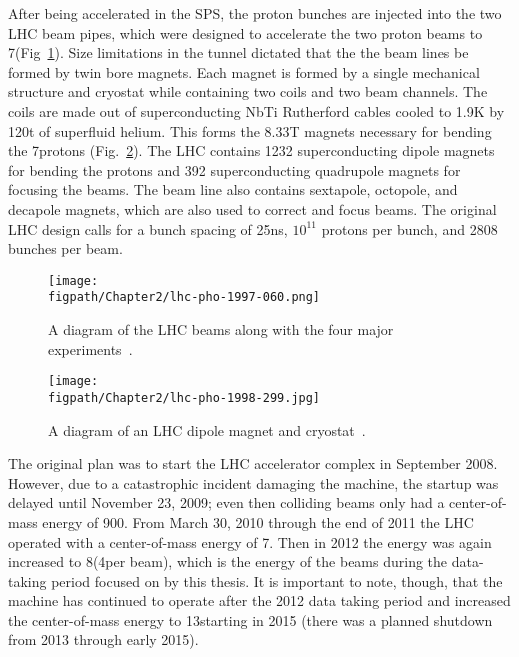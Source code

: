\clearpage

After being accelerated in the SPS, the proton bunches are injected into the two LHC beam pipes, which were designed to accelerate the two proton beams to 7\TeV (Fig~\ref{fig:LHC_beams}).
Size limitations in the tunnel dictated that the the beam lines be formed by twin bore magnets.
Each magnet is formed by a single mechanical structure and cryostat while containing two coils and two beam channels.
The coils are made out of superconducting NbTi Rutherford cables cooled to 1.9\unit{K} by 120\unit{t} of superfluid helium.
This forms the 8.33\unit{T} magnets necessary for bending the 7\TeV protons (Fig.~\ref{fig:LHC_magnet}).
The LHC contains 1232 superconducting dipole magnets for bending the protons and 392 superconducting quadrupole magnets for focusing the beams.
The beam line also contains sextapole, octopole, and decapole magnets, which are also used to correct and focus beams.
The original LHC design calls for a bunch spacing of 25\unit{ns}, $10^{11}$ protons per bunch, and 2808 bunches per beam.

\begin{figure}[!hbt]
    \centering
    \texttt{[image: \\figpath/Chapter2/lhc-pho-1997-060.png]}
    \caption{A diagram of the LHC beams along with the four major experiments~\cite{Jean-Luc:841573}.}
    \label{fig:LHC_beams}
\end{figure}

\begin{figure}[!hbt]
    \centering
    \texttt{[image: \\figpath/Chapter2/lhc-pho-1998-299.jpg]}
    \caption{A diagram of an LHC dipole magnet and cryostat~\cite{Dailler:842253}.}
    \label{fig:LHC_magnet}
\end{figure}

The original plan was to start the LHC accelerator complex in September 2008.
However, due to a catastrophic incident damaging the machine, the startup was delayed until November 23, 2009; even then colliding beams only had a center-of-mass energy of 900\GeV.
From March 30, 2010 through the end of 2011 the LHC operated with a center-of-mass energy of 7\TeV.
Then in 2012 the energy was again increased to 8\TeV (4\TeV per beam), which is the energy of the beams during the data-taking period focused on by this thesis.
It is important to note, though, that the machine has continued to operate after the 2012 data taking period and increased the center-of-mass energy to 13\TeV starting in 2015 (there was a planned shutdown from 2013 through early 2015).


